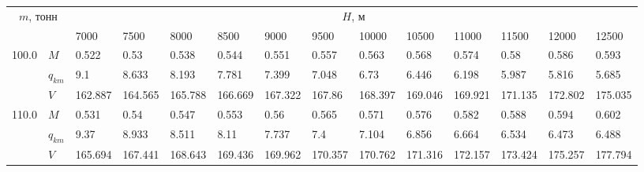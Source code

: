 \begin{tabular}{|l|l|llllllllllll|}\hline
\multicolumn{2}{|c|}{$m$, тонн}& \multicolumn{12}{c|}{$H$, м}\\ 
 \cline{3-14}
 \multicolumn{2}{|c|}{}&     7000 &     7500 &     8000 &                      8500 &                      9000 &                      9500 &                     10000 &                     10500 &                     11000 &                     11500 &                     12000 &                     12500 \\
\hline
100.0 & $M$ &    0.522 &     0.53 &    0.538 &                     0.544 &                     0.551 &                     0.557 &                     0.563 &                     0.568 &                     0.574 &                      0.58 &                     0.586 &    0.593\cellcolor{green} \\
      & $q_{km}$ &      9.1 &    8.633 &    8.193 &                     7.781 &                     7.399 &                     7.048 &                      6.73 &                     6.446 &                     6.198 &                     5.987 &                     5.816 &    5.685\cellcolor{green} \\
      & $V$ &  162.887 &  164.565 &  165.788 &                   166.669 &                   167.322 &                    167.86 &                   168.397 &                   169.046 &                   169.921 &                   171.135 &                   172.802 &  175.035\cellcolor{green} \\
\hline
110.0 & $M$ &    0.531 &     0.54 &    0.547 &                     0.553 &                      0.56 &                     0.565 &                     0.571 &                     0.576 &                     0.582 &                     0.588 &    0.594\cellcolor{green} &                     0.602 \\
      & $q_{km}$ &     9.37 &    8.933 &    8.511 &                      8.11 &                     7.737 &                       7.4 &                     7.104 &                     6.856 &                     6.664 &                     6.534 &    6.473\cellcolor{green} &                     6.488 \\
      & $V$ &  165.694 &  167.441 &  168.643 &                   169.436 &                   169.962 &                   170.357 &                   170.762 &                   171.316 &                   172.157 &                   173.424 &  175.257\cellcolor{green} &                   177.794 \\

\end{tabular}
